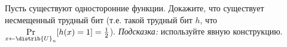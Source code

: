 Пусть существуют односторонние функции. Докажите, что существует несмещенный трудный бит (т.е. такой
трудный бит $h$, что $\Pr\limits_{x \gets \distrib{U}_n}[h(x) = 1] = \frac{1}{2}$).
\textit{Подсказка:} используйте явную конструкцию.